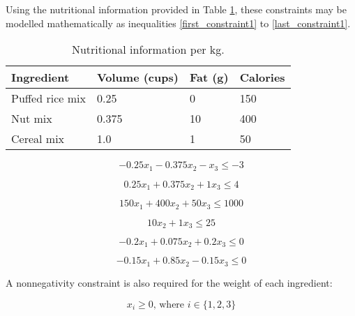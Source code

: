 \documentclass[11pt, a4paper]{article}
\begin{document}
    Using the nutritional information provided in Table \ref{nutrients}, these constraints may be modelled mathematically as inequalities \ref{first_constraint1} to \ref{last_constraint1}.

    \begin{table}[!ht]
        \centering
        \caption{Nutritional information per kg.}
        \begin{tabular}{|l|l|l|l|}
            \hline
            Ingredient      & Volume (cups)     & Fat (g)   & Calories  \\ \hline
            Puffed rice mix & 0.25              & 0         & 150       \\ \hline
            Nut mix         & 0.375             & 10        & 400       \\ \hline
            Cereal mix      & 1.0               & 1         & 50        \\ \hline          
        \end{tabular}
        \label{nutrients}
    \end{table}

    \begin{equation}
        -0.25x_1 - 0.375x_2 - x_3 \leq -3
        \label{first_constraint1}
    \end{equation}

    \begin{equation}
        0.25x_1 + 0.375x_2 + 1x_3 \leq 4
    \end{equation}
    
    \begin{equation}
        150x_1 + 400x_2 + 50x_3 \leq 1000
    \end{equation}

    \begin{equation}
        10x_2 + 1x_3 \leq 25
    \end{equation}

    \begin{equation}
        -0.2x_1 + 0.075x_2 + 0.2x_3 \leq 0
    \end{equation}

    \begin{equation}
        -0.15x_1 + 0.85x_2 - 0.15x_3 \leq 0
        \label{last_constraint1}
    \end{equation}

    A nonnegativity constraint is also required for the weight of each ingredient:

    \begin{equation}
        x_i \geq 0 \textrm{, where } i \in \{1, 2, 3\}
        \label{nonneg_constraint1}
    \end{equation}
\end{document}
